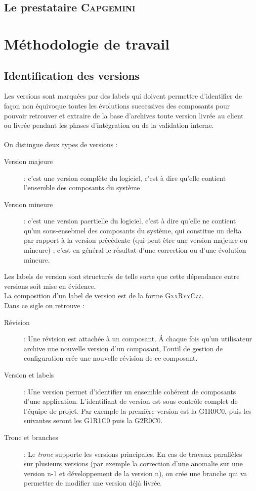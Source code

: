 		\section{Le prestataire \textsc{Capgemini}}
	\chapter{Méthodologie de travail}
	\section{Identification des versions}

	Les versions sont marquées par des labels qui doivent permettre d'identifier de façon non équivoque toutes les évolutions successives des composants pour pouvoir retrouver et extraire de la base d'archives toute version livrée au client ou livrée pendant les phases d'intégration ou de la validation interne.
	\\\\
	On distingue deux types de versions :
	\begin{description}
		\item[Version majeure] : c'est une version complète du logiciel, c'est à dire qu'elle contient l'ensemble des composants du système
		\item[Version mineure] : c'est une version paertielle du logiciel, c'est à dire qu'elle ne contient qu'un sous-ensebmel des composants du système, qui constitue un delta par rapport à la version précédente
		(qui peut être une version majeure ou mineure) ; c'est en général le résultat d'une correction ou d'une évolution mineure.
	\end{description}
	Les labels de version sont structurés de telle sorte que cette dépendance entre versions soit mise en évidence.
	\\La composition d'un label de version est de la forme \textsc{GxxRyyCzz}.
	\\Dans ce sigle on retrouve :
	\begin{description}
		\item[Révision] : Une révision est attachée à un composant. \'A chaque fois qu'un utilisateur archive une nouvelle version d'un composant, l'outil de gestion de configuration crée une nouvelle révision de ce composant.
		\item[Version et labels] : Une version permet d'identifier un ensemble cohérent de composants d'une application. L'identifiant de version est sous contrôle complet de l'équipe de projet. Par exemple la première version est la G1R0C0, puis les suivantes seront les
		G1R1C0 puis la G2R0C0.
		\item[Tronc et branches] : Le \textit{tronc} supporte les versions principales. En cas de travaux parallèles sur plusieurs versions (par exemple la correction d'une anomalie sur une version n-1 et développement de la version n), on crée une branche qui va permettre de modifier une version déjà livrée.
		\\
		 \end{description}
